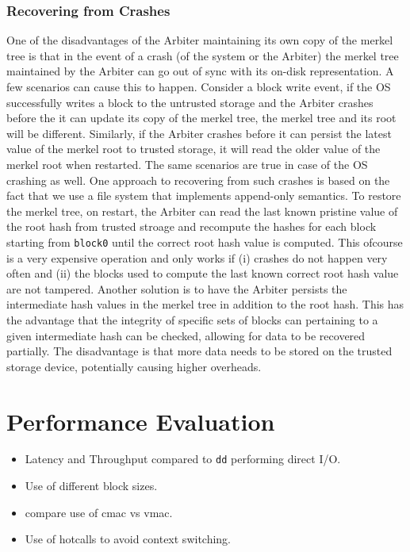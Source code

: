 \documentclass[withindex,glossary]{cam-thesis}
\begin{document}
\subsubsection{Recovering from Crashes}
One of the disadvantages of the Arbiter maintaining its own copy of the merkel tree is that in the event of a crash (of the system or the Arbiter) the merkel tree maintained by the Arbiter can go out of sync with its on-disk representation.
A few scenarios can cause this to happen.
Consider a block write event, if the OS successfully writes a block to the untrusted storage and the Arbiter crashes before the it can update its copy of the merkel tree, the merkel tree and its root will be different.
Similarly, if the Arbiter crashes before it can persist the latest value of the merkel root to trusted storage, it will read the older value of the merkel root when restarted.
The same scenarios are true in case of the OS crashing as well.
One approach to recovering from such crashes is based on the fact that we use a file system that implements append-only semantics.
To restore the merkel tree, on restart, the Arbiter can read the last known pristine value of the root hash from trusted stroage and recompute the hashes for each block starting from \texttt{block0} until the correct root hash value is computed.
This ofcourse is a very expensive operation and only works if (i) crashes do not happen very often and (ii) the blocks used to compute the last known correct root hash value are not tampered.
Another solution is to have the Arbiter persists the intermediate hash values in the merkel tree in addition to the root hash.
This has the advantage that the integrity of specific sets of blocks can pertaining to a given intermediate hash can be checked, allowing for data to be recovered partially.
The disadvantage is that more data needs to be stored on the trusted storage device, potentially causing higher overheads.


\section{Performance Evaluation}
\begin{itemize}
\item Latency and Throughput compared to \texttt{dd} performing direct I/O.
\item Use of different block sizes.
\item compare use of cmac vs vmac.
\item Use of hotcalls to avoid context switching.
\end{itemize}
\end{document}
